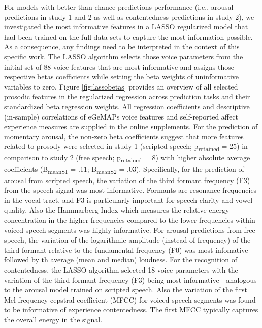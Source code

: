 \documentclass[
  english,
  man,floatsintext]{apa6}
\begin{document}
For models with better-than-chance predictions performance (i.e., arousal predictions in study 1 and 2 as well as contentedness predictions in study 2), we investigated the most informative features in a LASSO regularized model that had been trained on the full data sets to capture the most information possible. As a consequence, any findings need to be interpreted in the context of this specific work. The LASSO algorithm selects those voice parameters from the initial set of 88 voice features that are most informative and assigns those respective betas coefficients while setting the beta weights of uninformative variables to zero. Figure \ref{fig:lassobetas} provides an overview of all selected prosodic features in the regularized regression across prediction tasks and their standardized beta regression weights. All regression coefficients and descriptive (in-sample) correlations of eGeMAPs voice features and self-reported affect experience measures are supplied in the online supplements.
For the prediction of momentary arousal, the non-zero beta coefficients suggest that more features related to prosody were selected in study 1 (scripted speech; p\textsubscript{retained} = 25) in comparison to study 2 (free speech; p\textsubscript{retained} = 8) with higher absolute average coefficients (B\textsubscript{meanS1} = .11; B\textsubscript{meanS2} = .03). Specifically, for the prediction of arousal from scripted speech, the variation of the third formant frequency (F3) from the speech signal was most informative. Formants are resonance frequencies in the vocal tract, and F3 is particularly important for speech clarity and vowel quality. Also the Hammarberg Index which measures the relative energy concentration in the higher frequencies compared to the lower frequencies within voiced speech segments was highly informative.
For arousal predictions from free speech, the variation of the logarithmic amplitude (instead of frequency) of the third formant relative to the fundamental frequency (F0) was most infomative followed by th average (mean and median) loudness.
For the recognition of contentedness, the LASSO algorithm selected 18 voice parameters with the variation of the third formant frequency (F3) being most informative - analogous to the arousal model trained on scripted speech. Also the variation of the first Mel-frequency cepstral coefficient (MFCC) for voiced speech segments was found to be informative of experience contentedness. The first MFCC typically captures the overall energy in the signal.
\newpage
\end{document}
